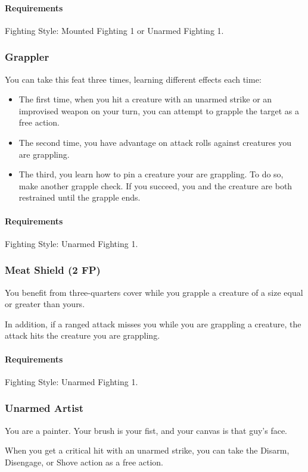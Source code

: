     \paragraph{Requirements} Fighting Style: Mounted Fighting 1 or Unarmed Fighting 1.
\subsubsection{Grappler} \label{feat::grappler}
    You can take this feat three times, learning different effects each time:
    \begin{itemize}
        \item The first time, when you hit a creature with an unarmed strike or an improvised weapon on your turn, you can attempt to grapple the target as a free action.
        \item The second time, you have advantage on attack rolls against creatures you are grappling.
        \item The third, you learn how to pin a creature your are grappling.
        To do so, make another grapple check.
        If you succeed, you and the creature are both restrained until the grapple ends.
    \end{itemize}
    \paragraph{Requirements} Fighting Style: Unarmed Fighting 1.
\subsubsection{Meat Shield (2 FP)} \label{feat::meatshield}
    You benefit from three-quarters cover while you grapple a creature of a size equal or greater than yours.

    In addition, if a ranged attack misses you while you are grappling a creature, the attack hits the creature you are grappling.
    \paragraph{Requirements} Fighting Style: Unarmed Fighting 1.
\subsubsection{Unarmed Artist} \label{feat::unarmedartist}
    You are a painter.
    Your brush is your fist, and your canvas is that guy's face.

    When you get a critical hit with an unarmed strike, you can take the Disarm, Disengage, or Shove action as a free action.
